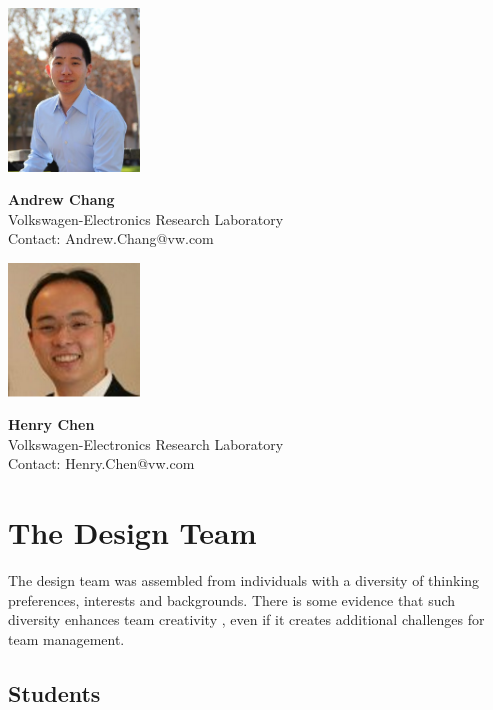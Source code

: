 \noindent \includegraphics[width=35mm]{Figures/People/andrew}
\hspace{1em}\parbox[b]{0.6\textwidth}{\textbf{Andrew Chang}\\
Volkswagen-Electronics Research Laboratory\\
Contact: Andrew.Chang@vw.com\\
}
\vspace{2em}

\noindent \includegraphics[width=35mm]{Figures/People/Henry}
\hspace{1em}\parbox[b]{0.6\textwidth}{\textbf{Henry Chen}\\
Volkswagen-Electronics Research Laboratory \\
Contact: Henry.Chen@vw.com\\
}

\clearpage

\section{The Design Team}
\label{sec:team}

The design team was assembled from individuals with a diversity of thinking preferences, interests and backgrounds. There is some evidence that such diversity enhances team creativity \cite{Wilde97, Wilde07} , even if it creates additional challenges for team management.

\subsection{Students}

